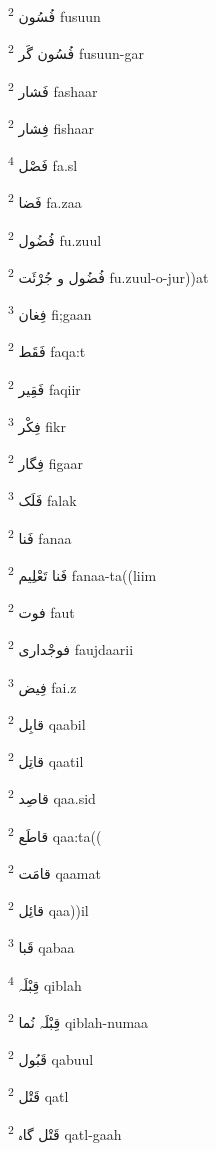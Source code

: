 \documentclass[12pt]{article}
\begin{document}
\begin{multicols}{5}
{\ur فُسُون}   \textsuperscript{2} fusuun

{\ur فُسُون گَر}   \textsuperscript{2} fusuun-gar

{\ur فَشار}   \textsuperscript{2} fashaar

{\ur فِشار}   \textsuperscript{2} fishaar

{\ur فَصْل}   \textsuperscript{4} fa.sl

{\ur فَضا}   \textsuperscript{2} fa.zaa

{\ur فُضُول}   \textsuperscript{2} fu.zuul

{\ur فُضُول و جُرْئَت}   \textsuperscript{2} fu.zuul-o-jur))at

{\ur فِغان}   \textsuperscript{3} fi;gaan

{\ur فَقَط}   \textsuperscript{2} faqa:t

{\ur فَقِیر}   \textsuperscript{2} faqiir

{\ur فِکْر}   \textsuperscript{3} fikr

{\ur فِگار}   \textsuperscript{2} figaar

{\ur فَلَک}   \textsuperscript{3} falak

{\ur فَنا}   \textsuperscript{2} fanaa

{\ur فَنا تَعْلِیم}   \textsuperscript{2} fanaa-ta((liim

{\ur فوت}   \textsuperscript{2} faut

{\ur فوجْداری}   \textsuperscript{2} faujdaarii

{\ur فِیض}   \textsuperscript{3} fai.z

{\ur قابِل}   \textsuperscript{2} qaabil

{\ur قاتِل}   \textsuperscript{2} qaatil

{\ur قاصِد}   \textsuperscript{2} qaa.sid

{\ur قاطَع}   \textsuperscript{2} qaa:ta((

{\ur قامَت}   \textsuperscript{2} qaamat

{\ur قائِل}   \textsuperscript{2} qaa))il

{\ur قَبا}   \textsuperscript{3} qabaa

{\ur قِبْلَہ}   \textsuperscript{4} qiblah

{\ur قِبْلَہ نُما}   \textsuperscript{2} qiblah-numaa

{\ur قَبُول}   \textsuperscript{2} qabuul

{\ur قَتْل}   \textsuperscript{2} qatl

{\ur قَتْل گاہ}   \textsuperscript{2} qatl-gaah


\end{multicols}
\end{document}
